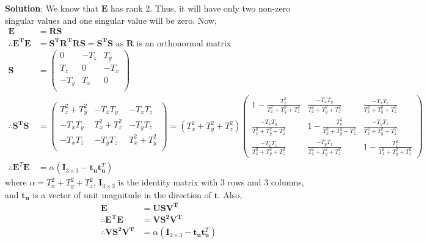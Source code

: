 \documentclass[11pt]{article}
\begin{document}
\begin{enumerate}
\begin{enumerate}
\textbf{Solution}:
We know that $\mathbf{E}$ has rank 2. Thus, it will have only two non-zero singular values and one singular value will be zero. Now,
\begin{align*}
\mathbf{E} &= \mathbf{R}\mathbf{S} \\
\therefore \mathbf{E^T}\mathbf{E} &= \mathbf{S^T}\mathbf{R^T}\mathbf{R}\mathbf{S} = \mathbf{S^T}\mathbf{S} \text{ as } \mathbf{R} \text{ is an orthonormal matrix}\\
\mathbf{S} &= 
\begin{pmatrix}
0 & -T_z & T_y \\
T_z & 0 & -T_x \\
-T_y & T_x & 0 \\
\end{pmatrix}\\
\therefore \mathbf{S^T}\mathbf{S} &= 
\begin{pmatrix}
T_z^2 + T_y^2 & -T_x T_y & -T_x T_z \\
-T_x T_y & T_x^2 + T_z^2 & -T_y T_z \\
-T_x T_z & -T_y T_z & T_x^2 + T_y^2 \\
\end{pmatrix} = (T_x^2+T_y^2+T_z^2)
\begin{pmatrix}
1 - \frac{T_x^2}{T_x^2+T_y^2+T_z^2} & \frac{-T_x T_y}{T_x^2+T_y^2+T_z^2} & \frac{-T_x T_z}{T_x^2+T_y^2+T_z^2} \\
\frac{-T_x T_y}{T_x^2+T_y^2+T_z^2} & 1 - \frac{T_y^2}{T_x^2+T_y^2+T_z^2} & \frac{-T_y T_z}{T_x^2+T_y^2+T_z^2} \\
\frac{-T_x T_z}{T_x^2+T_y^2+T_z^2} &  \frac{-T_y T_z}{T_x^2+T_y^2+T_z^2} & 1 - \frac{T_z^2}{T_x^2+T_y^2+T_z^2}
\end{pmatrix}\\
\therefore \textbf{E}^T \textbf{E} &= \alpha (\textbf{I}_{3 \times 3} - \textbf{t}_\textbf{u} \textbf{t}^T_\textbf{u})
\end{align*}
where $\alpha = T_x^2+T_y^2+T_z^2$, $\textbf{I}_{3 \times 3}$  is the identity matrix with 3 rows and 3 columns, and $\textbf{t}_\textbf{u}$ is a vector of unit magnitude in the direction of $\textbf{t}$. Also,
\begin{align*}
\mathbf{E} &= \mathbf{U}\mathbf{S}\mathbf{V^T}\\
\therefore \mathbf{E^T}\mathbf{E} &= \mathbf{V}\mathbf{S^2}\mathbf{V^T}\\
\therefore \mathbf{V}\mathbf{S^2}\mathbf{V^T} &= \alpha (\textbf{I}_{3 \times 3} - \textbf{t}_\textbf{u} \textbf{t}^T_\textbf{u}) \\

\end{align*}
\end{enumerate}
\end{enumerate}
\end{document}
